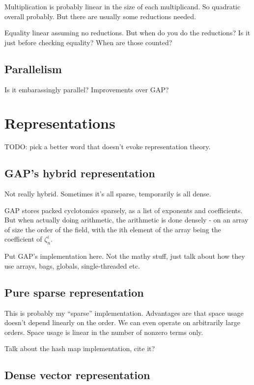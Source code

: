\documentclass{article}
\begin{document}
Multiplication is probably linear in the size of each multiplicand. So
quadratic overall probably. But there are usually some reductions
needed.

Equality linear assuming no reductions. But when do you do the
reductions? Is it just before checking equality? When are those
counted?

\subsection{Parallelism}

Is it embarassingly parallel? Improvements over GAP?

\section{Representations}

TODO: pick a better word that doesn't evoke representation theory.

\subsection{GAP's hybrid representation}

Not really hybrid. Sometimes it's all sparse, temporarily is all
dense.

GAP stores packed cyclotomics sparsely, as a list of exponents and
coefficients. But when actually doing arithmetic, the arithmetic is
done densely - on an array of size the order of the field, with the
ith element of the array being the coefficient of $\zeta_n^i$.

Put GAP's implementation here. Not the mathy stuff, just talk about
how they use arrays, bags, globals, single-threaded etc.

\subsection{Pure sparse representation}

This is probably my ``sparse'' implementation. Advantages are that
space usage doesn't depend linearly on the order. We can even operate
on arbitrarily large orders. Space usage is linear in the number of
nonzero terms only.

Talk about the hash map implementation, cite it?

\subsection{Dense vector representation}
\end{document}
